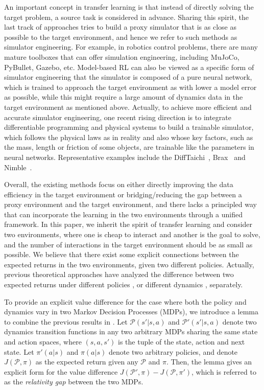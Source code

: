 \documentclass[letterpaper]{article} %
\def\P{{\mathcal{P}}}
\begin{document}
An important concept in transfer learning is that instead of directly solving the target problem, a source task is considered in advance. Sharing this spirit, the last track of approaches tries to build a proxy simulator that is as close as possible to the target environment, and hence we refer to such methods as simulator engineering. For example, in robotics control problems, there are many mature toolboxes that can offer simulation engineering, including MuJoCo, PyBullet, Gazebo, etc. Model-based RL can also be viewed as a specific form of simulator engineering that the simulator is composed of a pure neural network, which is trained to approach the target environment as with lower a model error as possible, while this might require a large amount of dynamics data in the target environment as mentioned above. Actually, to achieve more efficient and accurate simulator engineering, one recent rising direction is to integrate differentiable programming and physical systems to build a trainable simulator, which follows the physical laws as in reality and also whose key factors, such as the mass, length or friction of some objects, are trainable like the parameters in neural networks. Representative examples include the DiffTaichi~\citep{hu2020difftaichi}, Brax~\citep{brax2021github} and Nimble~\citep{werling2021fast}.

Overall, the existing methods focus on either directly improving the data efficiency in the target environment or bridging/reducing the gap between a proxy environment and the target environment, and there lacks a principled way that can incorporate the learning in the two environments through a unified framework.
In this paper, we inherit the spirit of transfer learning and consider two environments, where one is cheap to interact and another is the goal to solve, and the number of interactions in the target environment should be as small as possible.
We believe that there exist some explicit connections between the expected returns in the two environments, given two different policies.
Actually, previous theoretical approaches have analyzed the difference between two expected returns under different policies \citep{kakade2002,schulman2015trust}, or different dynamics \citep{luo2018algorithmic}, separately.

To provide an explicit value difference for the case where both the policy and dynamics vary in two Markov Decision Processes (MDPs), we introduce a lemma to combine the previous results in \citep{kakade2002,luo2018algorithmic}.
Let $\P(s'|s,a)$ and $\P'(s'|s,a)$ denote two dynamics transition functions in any two arbitrary MDPs sharing the same state and action spaces, where $(s,a,s')$ is the tuple of the state, action and next state. Let $\pi'(a|s)$ and $\pi(a|s)$ denote two arbitrary policies, and denote $J(\P, \pi)$ as the expected return given any $\P$ and $\pi$.
Then, the lemma gives an explicit form for the value difference $J(\P',\pi)-J(\P,\pi')$, which is referred to as the \emph{relativity gap} between the two MDPs.
\end{document}
